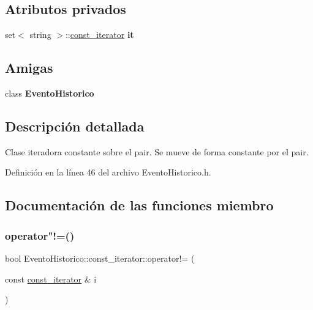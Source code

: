 \subsection*{Atributos privados}
\begin{DoxyCompactItemize}
\item 
\hypertarget{classEventoHistorico_1_1const__iterator_a3fcec2352480ee7db6e7c4fd01198890}{}\label{classEventoHistorico_1_1const__iterator_a3fcec2352480ee7db6e7c4fd01198890} 
set$<$ string $>$\+::\hyperlink{classEventoHistorico_1_1const__iterator}{const\+\_\+iterator} {\bfseries it}
\end{DoxyCompactItemize}
\subsection*{Amigas}
\begin{DoxyCompactItemize}
\item 
\hypertarget{classEventoHistorico_1_1const__iterator_a345fe3c840820562ba48d67773dc5591}{}\label{classEventoHistorico_1_1const__iterator_a345fe3c840820562ba48d67773dc5591} 
class {\bfseries Evento\+Historico}
\end{DoxyCompactItemize}


\subsection{Descripción detallada}
Clase iteradora constante sobre el pair. Se mueve de forma constante por el pair. 

Definición en la línea 46 del archivo Evento\+Historico.\+h.



\subsection{Documentación de las funciones miembro}
\hypertarget{classEventoHistorico_1_1const__iterator_a6ed8849e4fde8aff53c0e487bddb22c6}{}\label{classEventoHistorico_1_1const__iterator_a6ed8849e4fde8aff53c0e487bddb22c6} 
\subsubsection{\texorpdfstring{operator"!=()}{operator!=()}}
{\footnotesize\ttfamily bool Evento\+Historico\+::const\+\_\+iterator\+::operator!= (\begin{DoxyParamCaption}\item[{const \hyperlink{classEventoHistorico_1_1const__iterator}{const\+\_\+iterator} \&}]{i }\end{DoxyParamCaption})\hspace{0.3cm}{\ttfamily [inline]}}



